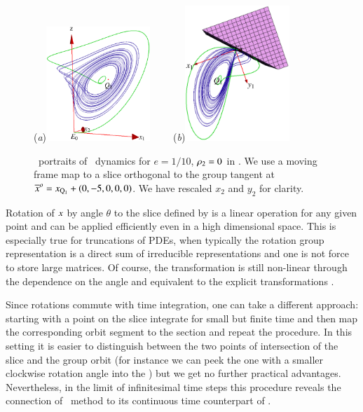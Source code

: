 {%
\begin{figure}[ht]
\begin{center}
  (\textit{a})\includegraphics[width=0.35\textwidth,clip=true]{../figs/CLEmfAdHoc1}
~~~~(\textit{b})\includegraphics[width=0.35\textwidth,clip=true]{../figs/CLEmfAdHoc135}
\end{center}
\caption{ \Statesp\
portraits of \cLe\ dynamics for $e=1/10$, $\rho_2=0$
in \reducedsp. We use a moving frame map to a slice orthogonal
to the group tangent at ${\overline{x}^o}  = x_{\mathrm{Q}_{1}}+(0,-5,0,0,0)$.
We have rescaled $x_2$ and $y_2$ for clarity. 
    }
\label{fig:CLEmfAdHoc}
\end{figure}


}%


Rotation of $x$ by angle $\theta$
to the slice defined by  is a linear operation
for any given point and can be applied efficiently
even in a high dimensional space. This is especially true
for truncations of PDEs, when typically the rotation group
representation is a direct sum of irreducible
representations and one is not force to store large matrices.
Of course, the transformation is still non-linear
through the dependence on the angle and equivalent to the
explicit transformations .


Since rotations commute with time integration, one can take a different approach:
starting with a point on the slice integrate for small but finite time and then map the
corresponding orbit segment to the section and repeat the procedure. In this setting it
is easier to distinguish between the two points of intersection of the slice and the group
orbit (for instance we can peek the one with a smaller clockwise rotation angle into the \slice)
but we get no further practical advantages. Nevertheless, in the limit of infinitesimal
time steps this procedure reveals the connection of \mframes\ method to
its continuous time counterpart of \refsect{sec:MovFrameODE}.
